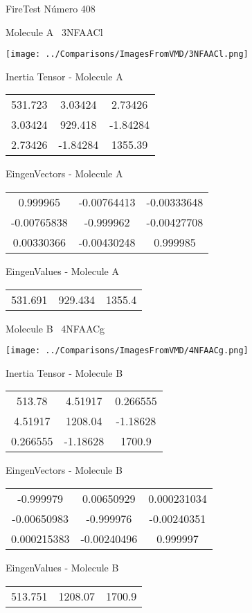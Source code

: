 \vtab[-3cm]
\begin{center}
{\large FireTest \tab Número 408}
\end{center}
\begin{multicols}{2}
\begin{center}

Molecule A \
3NFAACl

\texttt{[image: ../Comparisons/ImagesFromVMD/3NFAACl.png]}

Inertia Tensor - Molecule A \\
\begin{tabular}{|c c c|}
531.723	 & 	3.03424	 & 	2.73426	 \\
3.03424	 & 	929.418	 & 	-1.84284	 \\
2.73426	 & 	-1.84284	 & 	1355.39
\end{tabular}

\vtab
 EingenVectors - Molecule A     \\
\begin{tabular}{|c c c|}
0.999965	 & 	-0.00764413	 & 	-0.00333648	 \\
-0.00765838	 & 	-0.999962	 & 	-0.00427708	 \\
0.00330366	 & 	-0.00430248	 & 	0.999985
\end{tabular}

\vtab
 EingenValues - Molecule A     \\
\begin{tabular}{|c c c|}
531.691	 & 	929.434	 & 	1355.4	 \\
\end{tabular}
\columnbreak

Molecule B \
4NFAACg

\texttt{[image: ../Comparisons/ImagesFromVMD/4NFAACg.png]}

Inertia Tensor - Molecule B \\
\begin{tabular}{|c c c|}
513.78	 & 	4.51917	 & 	0.266555	 \\
4.51917	 & 	1208.04	 & 	-1.18628	 \\
0.266555	 & 	-1.18628	 & 	1700.9
\end{tabular}

\vtab
 EingenVectors - Molecule B     \\
\begin{tabular}{|c c c|}
-0.999979	 & 	0.00650929	 & 	0.000231034	 \\
-0.00650983	 & 	-0.999976	 & 	-0.00240351	 \\
0.000215383	 & 	-0.00240496	 & 	0.999997
\end{tabular}

\vtab
 EingenValues - Molecule B     \\
\begin{tabular}{|c c c|}
513.751	 & 	1208.07	 & 	1700.9	 \\
\end{tabular}

\end{center}
\end{multicols}

